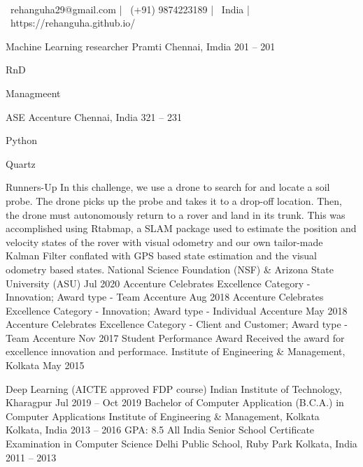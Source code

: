 \documentclass[]{awesome-cv}
\begin{document}
    
\begin{center}
	  \\
	\vspace{2mm}
	{\faEnvelope\ rehanguha29@gmail.com} | {\faMobile\ (+91) 9874223189} | {\faMapMarker\ India} | {\faLink\ https://rehanguha.github.io/}
\end{center}
\begin{cventries}
	\cventry
	{Machine Learning researcher}
	{Pramti}
	{Chennai, Imdia}
	{201 – 201}
	{\begin{cvitems}
		\item {R\textquotesingle{}n\textquotesingle{}D}
		\item {Managmeent}
		\end{cvitems}}
	\cventry
	{ASE}
	{Accenture}
	{Chennai, India}
	{321 – 231}
	{\begin{cvitems}
		\item {Python}
		\item {Quartz}
		\end{cvitems}}
\end{cventries}
\begin{cvhonors}
	\cvhonor
	{Runners-Up}
	{In this challenge, we use a drone to search for and locate a soil probe. The drone picks up the probe and takes it to a drop-off location. Then, the drone must autonomously return to a rover and land in its trunk. This was accomplished using Rtabmap, a SLAM package used to estimate the position and velocity states of the rover with visual odometry and our own tailor-made Kalman Filter conflated with GPS based state estimation and the visual odometry based states.}
	{National Science Foundation (NSF) \& Arizona State University (ASU)}
	{Jul 2020}
	\cvhonor
	{Accenture Celebrates Excellence}
	{Category - Innovation; Award type - Team}
	{Accenture}
	{Aug 2018}
	\cvhonor
	{Accenture Celebrates Excellence}
	{Category - Innovation; Award type - Individual}
	{Accenture}
	{May 2018}
	\cvhonor
	{Accenture Celebrates Excellence}
	{Category - Client and Customer; Award type - Team}
	{Accenture}
	{Nov 2017}
	\cvhonor
	{Student Performance Award}
	{Received the award for excellence innovation and performace.}
	{Institute of Engineering \& Management, Kolkata}
	{May 2015}
\end{cvhonors}
\begin{cventries}
	\cventry
	{Deep Learning (AICTE approved FDP course)}
	{Indian Institute of Technology, Kharagpur}
	{}
	{Jul 2019 – Oct 2019}
	{}
	\cventry
	{Bachelor of Computer Application (B.C.A.) in Computer Applications}
	{Institute of Engineering \& Management, Kolkata}
	{Kolkata, India}
	{2013 – 2016}
	{GPA: 8.5}
	\cventry
	{All India Senior School Certificate Examination in Computer Science}
	{Delhi Public School, Ruby Park}
	{Kolkata, India}
	{2011 – 2013}
	{}
\end{cventries}
\end{document}
